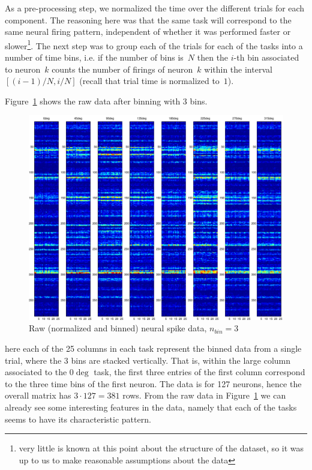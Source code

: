 As a pre-processing step, we normalized the time over the different trials for each component. The reasoning here was that the same task will correspond to the same neural firing pattern, independent of whether it was performed faster or slower\footnote{very little is known at this point about the structure of the dataset, so it was up to us to make reasonable assumptions about the data}. The next step was to group each of the trials for each of the tasks into a number of time bins, i.e. if the number of bins is~$N$ then the $i$-th bin associated to neuron~$k$ counts the number of firings of neuron~$k$ within the interval~$[(i-1)/N, i/N]$ (recall that trial time is normalized to~$1$). 

Figure~\ref{Applications:RPCAapps:BMI:raw3bins} shows the raw data after binning with 3 bins. 
%
\begin{figure}[h]
\centering
\includegraphics[width=\textwidth]{../figures/BMI_raw_3bins}
\caption{Raw (normalized and binned) neural spike data, $n_{bin}=3$}
\label{Applications:RPCAapps:BMI:raw3bins}
\end{figure}
%
here each of the 25 columns in each task represent the binned data from a single trial, where the 3 bins are stacked vertically. That is, within the large column associated to the $0\deg$ task, the first three entries of the first column correspond to the three time bins of the first neuron. The data is for 127 neurons, hence the overall matrix has $3\cdot127= 381$ rows. From the raw data in Figure~\ref{Applications:RPCAapps:BMI:raw3bins} we can already see some interesting features in the data, namely that each of the tasks seems to have its characteristic pattern. 

